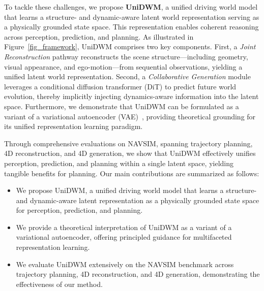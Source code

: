To tackle these challenges, we propose \textbf{UniDWM}, a unified driving world model that learns a structure- and dynamic-aware latent world representation serving as a physically grounded state space. This representation enables coherent reasoning across perception, prediction, and planning. As illustrated in Figure~\ref{fig_framework}, UniDWM comprises two key components. First, a \textit{Joint Reconstruction} pathway reconstructs the scene structure---including geometry, visual appearance, and ego-motion---from sequential observations, yielding a unified latent world representation. Second, a \textit{Collaborative Generation} module leverages a conditional diffusion transformer (DiT) to predict future world evolution, thereby implicitly injecting dynamics-aware information into the latent space. Furthermore, we demonstrate that UniDWM can be formulated as a variant of a variational autoencoder (VAE)~\cite{kingma2014auto, zhao2017infovae}, providing theoretical grounding for its unified representation learning paradigm.

Through comprehensive evaluations on NAVSIM, spanning trajectory planning, 4D reconstruction, and 4D generation, we show that UniDWM effectively unifies perception, prediction, and planning within a single latent space, yielding tangible benefits for planning. Our main contributions are summarized as follows:
\begin{itemize}
    \setlength{\itemsep}{0pt}
    \setlength{\parskip}{0pt}
    \setlength{\parsep}{0pt}
    \item We propose UniDWM, a unified driving world model that learns a structure- and dynamic-aware latent representation as a physically grounded state space for perception, prediction, and planning.
    \item We provide a theoretical interpretation of UniDWM as a variant of a variational autoencoder, offering principled guidance for multifaceted representation learning.
    \item We evaluate UniDWM extensively on the NAVSIM benchmark across trajectory planning, 4D reconstruction, and 4D generation, demonstrating the effectiveness of our method.
\end{itemize}

